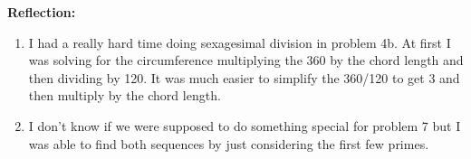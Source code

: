 \documentclass[12pt]{article}
\theoremstyle{homework}
\begin{document}
\textbf{Reflection:}
\begin{enumerate}
  \item I had a really hard time doing sexagesimal division in problem 4b. At first I was solving for the circumference
   multiplying the 360 by the chord length and then dividing by 120. It was much easier to simplify the 360/120 to get 3
  and then multiply by the chord length. 
\item I don't know if we were supposed to do something special for problem 7 but I was able to find both sequences by just 
considering the first few primes.                                                                                                                                                                                                                                                                                                                    
\end{enumerate}
\end{document}
